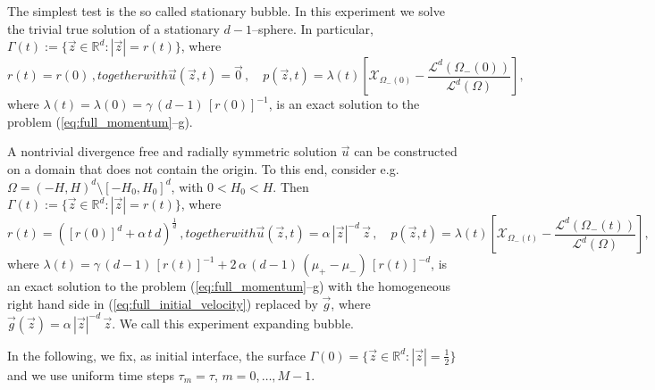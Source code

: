 \documentclass[a4paper,12pt,onecolumn]{article}
\newcommand{\R}{{\mathbb R}}
\newcommand{\bigchi}{\ensuremath{\mathrm{\mathcal{X}}}}
\newcommand{\charfcn}[1]{\bigchi_{#1}} %
\begin{document}
The simplest test is the so called stationary bubble. In this experiment we solve the trivial true solution of a stationary $d-1$--sphere. In particular, $\Gamma(t) := \{ \vec z \in \R^d : |\vec z| = r(t)\}$, where
\begin{subequations}
\begin{equation} \label{eq:radialr}
r(t) = r(0)\,,
\end{equation}
together with 
\begin{equation} \label{eq:radialup}
\vec u(\vec z, t) = \vec 0 \,,\quad p(\vec z, t) = \lambda(t)\left[\charfcn{\Omega_-(0)} -\frac{\mathcal{L}^d(\Omega_-(0))}{\mathcal{L}^d(\Omega)} \right] ,
\end{equation}
\end{subequations}
where $\lambda(t) = \lambda(0) = \gamma\,(d-1)\,[r(0)]^{-1}$, is an exact solution to the problem (\ref{eq:full_momentum}--g).

A nontrivial divergence free and radially symmetric solution $\vec u$ can be constructed on a domain that does not contain the origin. To this end, consider e.g.\ $\Omega = (-H,H)^d \setminus [-H_0, H_0]^d$, with $0 < H_0 < H$. Then $\Gamma(t) := \{ \vec z \in \R^d : |\vec z| = r(t)\}$, where
\begin{subequations}
\begin{equation} \label{eq:radialr2}
r(t) = ([r(0)]^d + \alpha\,t\,d)^\frac1d \,,
\end{equation}
together with 
\begin{equation} \label{eq:radialup2}
\vec u(\vec z, t) = \alpha\,|\vec z|^{-d}\,\vec z \,, \quad p(\vec z, t) = \lambda(t)\left[ \charfcn{\Omega_-(t)} - \frac{\mathcal{L}^d(\Omega_-(t))}{\mathcal{L}^d(\Omega)}\right],
\end{equation}
\end{subequations}
where $\lambda(t) = \gamma\,(d-1)\,[r(t)]^{-1} + 2\,\alpha\,(d-1)\,(\mu_+ - \mu_-)\,[r(t)]^{-d}$, is an exact solution to the problem (\ref{eq:full_momentum}--g) with the homogeneous right hand side in (\ref{eq:full_initial_velocity}) replaced by $\vec g$, where $\vec g(\vec z) = \alpha\,|\vec z|^{-d}\,\vec z$. We call this experiment expanding bubble.

In the following, we fix, as initial interface, the surface $\Gamma(0) = \{ \vec z \in \R^d : |\vec z| = \frac12 \}$ and we use uniform time steps $\tau_m=\tau$, $m=0,\ldots, M-1$.
\end{document}
